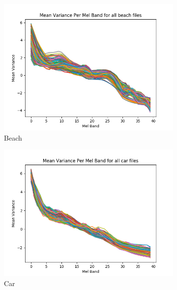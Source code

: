 \documentclass[11pt]{article}
\begin{document}
\begin{figure}[h]
	\centering
	\begin{subfigure}[t]{0.31\textwidth}
		\centering
		\includegraphics[width=\textwidth]{figures/beachVar.png}
		\caption{Beach}
	\end{subfigure}
	\begin{subfigure}[t]{0.31\textwidth}
		\centering
		\includegraphics[width=\textwidth]{figures/carVar.png}
		\caption{Car}
	\end{subfigure}
	\begin{subfigure}[t]{0.31\textwidth}
		\centering

\end{subfigure}
\end{figure}
\end{document}
